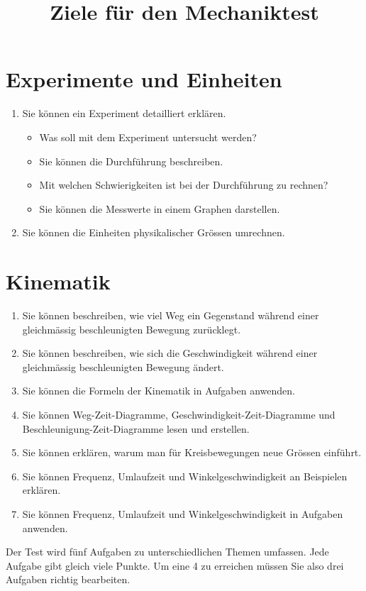 \documentclass[12pt,a4paper,twoside]{article}
\title{Ziele für den Mechaniktest}
\date{}
\begin{document}
\maketitle

\section*{Experimente und Einheiten}
\begin{enumerate}
	\item Sie können ein Experiment detailliert erklären.
		\begin{itemize}
			\item Was soll mit dem Experiment untersucht werden?
			\item Sie können die Durchführung beschreiben.
			\item Mit welchen Schwierigkeiten ist bei der Durchführung zu rechnen?
			\item Sie können die Messwerte in einem Graphen darstellen.
		\end{itemize}
	\item Sie können die Einheiten physikalischer Grössen umrechnen.
\end{enumerate}

\section*{Kinematik}

\begin{enumerate}
	\item Sie können beschreiben, wie viel Weg ein Gegenstand während einer gleichmässig beschleunigten Bewegung zurücklegt.
	\item Sie können beschreiben, wie sich die Geschwindigkeit während einer gleichmässig beschleunigten Bewegung ändert.
	\item Sie können die Formeln der Kinematik in Aufgaben anwenden.
	\item Sie können Weg-Zeit-Diagramme, Geschwindigkeit-Zeit-Diagramme und Beschleunigung-Zeit-Diagramme lesen und erstellen.
	
	\item Sie können erklären, warum man für Kreisbewegungen neue Grössen einführt.
	\item Sie können Frequenz, Umlaufzeit und Winkelgeschwindigkeit an Beispielen erklären.
	\item Sie können Frequenz, Umlaufzeit und Winkelgeschwindigkeit in Aufgaben anwenden.
\end{enumerate}

Der Test wird fünf Aufgaben zu unterschiedlichen Themen umfassen. Jede Aufgabe gibt gleich viele Punkte.
Um eine 4 zu erreichen müssen Sie also drei Aufgaben richtig bearbeiten.
\end{document}
